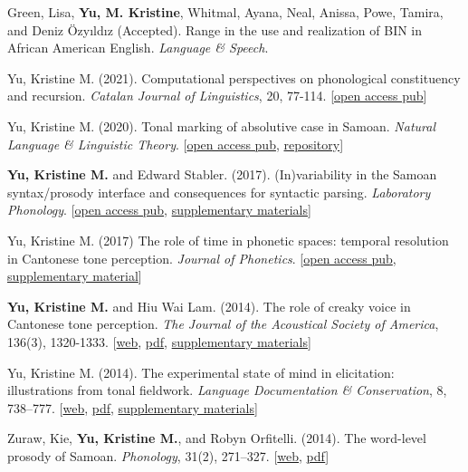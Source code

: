 \documentclass[10pt]{article}
\begin{document}
\begin{bibenum}
\item Green, Lisa, \textbf{Yu, M. Kristine}, Whitmal, Ayana, Neal, Anissa, Powe, Tamira, and Deniz \"{O}zy\i{}ld\i{}z (Accepted). Range in the use and realization of BIN in African American English. \emph{Language \& Speech}.

\item Yu, Kristine M. (2021). Computational perspectives on phonological constituency and recursion. \emph{Catalan Journal of Linguistics}, 20, 77-114. [\href{https://doi.org/10.5565/rev/catjl.354}{open access pub}] 
  
\item Yu, Kristine M. (2020). Tonal marking of absolutive case in Samoan. \emph{Natural Language \& Linguistic Theory}. [\href{https://link.springer.com/article/10.1007\%2Fs11049-020-09470-2}{open access pub}, \href{https://osf.io/8cvg5/?view\_only=e9be8cb15097493897b826f53487e345}{repository}]
      \item \textbf{Yu, Kristine M.} and Edward Stabler. (2017).
        (In)variability in the Samoan syntax/prosody interface and consequences for
        syntactic parsing. \emph{Laboratory Phonology}. [\href{https://www.journal-labphon.org/articles/10.5334/labphon.113/}{open access pub}, \href{https://doi.org/10.5334/labphon.113.s1}{supplementary materials}]
    \item Yu, Kristine M. (2017) The role of time in phonetic
      spaces: temporal resolution in Cantonese tone
      perception. \emph{Journal of Phonetics}. [\href{https://doi.org/10.1016/j.wocn.2017.06.004}{open access pub}, \href{https://github.com/krismyu/resolution}{supplementary material}]
    \item \textbf{Yu, Kristine M.} and Hiu Wai Lam. (2014). The role of
      creaky voice in Cantonese tone perception. \emph{The Journal of
        the Acoustical Society of America}, 136(3), 1320-1333.
      [\href{http://scitation.aip.org/content/asa/journal/jasa/136/3/10.1121/1.4887462}{web},
      \href{http://www.krisyu.org/pages/pdfs/yulam2014-jasa-cantcr.pdf}{pdf},
      \href{http://www.krisyu.org/blog/supp-material-cantonese-creak-perception.html}{supplementary materials}]

    \item Yu, Kristine M. (2014). The experimental state of mind in
      elicitation: illustrations from tonal fieldwork. \emph{Language Documentation \&
        Conservation}, 8, 738--777. 
      [\href{http://scholarspace.manoa.hawaii.edu/bitstream/handle/10125/24623/Yu.pdf?sequence=1}{web},
      \href{http://www.krisyu.org/pages/pdfs/yu2014-kiy.pdf}{pdf}, 
      \href{http://www.krisyu.org/blog/ldc-kiy-overview.html}{supplementary materials}]

    \item Zuraw, Kie, \textbf{Yu, Kristine M.}, and Robyn Orfitelli. (2014). The word-level prosody of
      {S}amoan. \emph{Phonology}, 31(2), 271--327.
      [\href{http://dx.doi.org/10.1017/S095267571400013X}{web},
      \href{http://www.krisyu.org/pages/pdfs/zurawyuorfitelli2014.pdf}{pdf}]

\end{bibenum}
\end{document}
